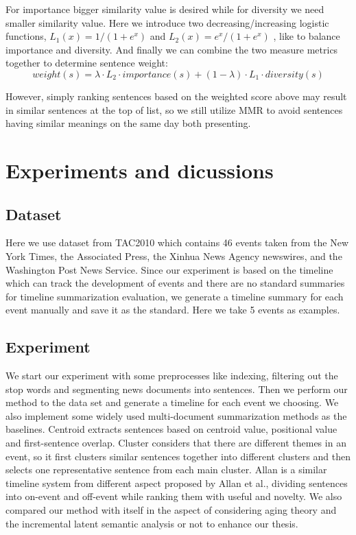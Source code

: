 \documentclass[runningheads,a4paper]{llncs}
\begin{document}
For importance bigger similarity value is desired while for diversity we need smaller similarity value. Here we introduce two decreasing/increasing logistic functions,  $L_1(x) = 1/(1+e^x)$  and $L_2(x) = e^x / (1+e^x)$ , like \cite{2011-Yan-p745-754} to balance importance and diversity. And finally we can combine the two measure metrics together to determine sentence weight:
\begin{equation}
weight(s) = \lambda \cdot L_2 \cdot importance(s) + (1- \lambda ) \cdot L_1 \cdot  diversity(s)
\end{equation}

However, simply ranking sentences based on the weighted score above may result in similar sentences at the top of list, so we still utilize MMR \cite{1998-Carbonell-p335-336} to avoid sentences having similar meanings on the same day both presenting.

\section{Experiments and dicussions}
\subsection{Dataset}
Here we use dataset from TAC2010 which contains 46 events taken from the New York Times, the Associated Press, the Xinhua News Agency newswires, and the Washington Post News Service. Since our experiment is based on the timeline which can track the development of events and there are no standard summaries for timeline summarization evaluation, we generate a timeline summary for each event manually and save it as the standard. Here we take 5 events as examples.
\subsection{Experiment}
We start our experiment with some preprocesses like indexing, filtering out the stop words and segmenting news documents into sentences. Then we perform our method to the data set and generate a timeline for each event we choosing. We also implement some widely used multi-document summarization methods as the baselines.
Centroid extracts sentences based on centroid value, positional value and first-sentence overlap.
Cluster considers that there are different themes in an event, so it first clusters similar sentences together into different clusters and then selects one representative sentence from each main cluster.
Allan is a similar timeline system from different aspect proposed by Allan et al., dividing sentences into on-event and off-event while ranking them with useful and novelty.
We also compared our method with itself in the aspect of considering aging theory and the incremental latent semantic analysis or not to enhance our thesis.
\end{document}

